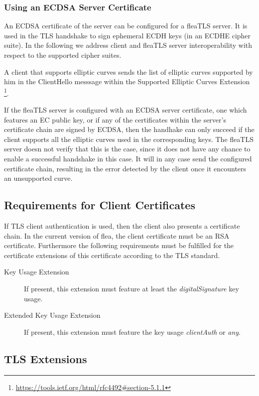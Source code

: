 \documentclass[a4paper,11pt]{scrartcl}
\begin{document}
\subsubsection{Using an ECDSA Server Certificate}

An ECDSA certificate of the server can be configured for a fleaTLS server. It is used in the TLS handshake to sign
ephemeral ECDH keys (\ie in an ECDHE cipher suite). In the following we address
client and fleaTLS server interoperability with respect to the supported cipher
suites.

A client that supports
elliptic curves sends the list of elliptic curves supported  by him in the
ClientHello messsage within the Supported Elliptic
   Curves Extension
   \footnote{\url{https://tools.ietf.org/html/rfc4492\#section-5.1.1}}. 
   
   If the fleaTLS server is configured with an ECDSA server certificate, \ie one
   which features an EC public key,  or if any of the certificates within the
   server's certificate chain are signed by ECDSA, then the handhake can only
   succeed if the client supports all the elliptic curves used in the
   corresponding keys. The fleaTLS server doesn not verify that this is the case, since it
   does not have any chance to enable a successful handshake in this case. It
   will in any case send the configured certificate chain, resulting in the
   error detected by the client once it encounters an unsupported curve. 


\subsection{Requirements for Client Certificates}

If TLS client authentication is used, then the client also presents a
certificate chain. In the current version of flea, the client certificate must
be an RSA certificate. Furthermore the following requirements must be fulfilled
for the certificate extensions of this certificate according to the TLS standard.
\begin{description}
  \item [Key Usage Extension] If present, this extension must feature at least
    the \emph{digitalSignature} key usage.
  \item [Extended Key Usage Extension] If present, this extension must feature
    the key usage \emph{clientAuth} or \emph{any}.
\end{description}

\subsection{TLS Extensions}
\end{document}
